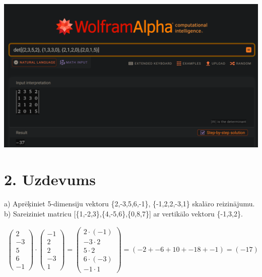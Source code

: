 \documentclass{article}
\begin{document}
\includegraphics[width=\textwidth]{1}

\clearpage

\section*{2. Uzdevums}
a) Aprēķiniet 5-dimensiju vektoru \{2,-3,5,6,-1\}, \{-1,2,2,-3,1\} skalāro reizinājumu. b) Sareiziniet matricu [\{1,-2,3\},\{4,-5,6\},\{0,8,7\}] ar vertikālo vektoru \{-1,3,2\}.

\begin{gather*}
    \begin{pmatrix}
        2\\
        -3\\
        5\\
        6\\
        -1
    \end{pmatrix}
    \cdot
    \begin{pmatrix}
        -1\\
        2\\
        2\\
        -3\\
        1
    \end{pmatrix}
    =
    \begin{pmatrix}
        2 \cdot (-1)\\
        -3 \cdot 2\\
        5 \cdot 2\\
        6 \cdot (-3)\\
        -1 \cdot 1
    \end{pmatrix}
    =
    (-2 + -6 + 10 + -18 + -1)
    =
    (-17)
\end{gather*}
\end{document}
